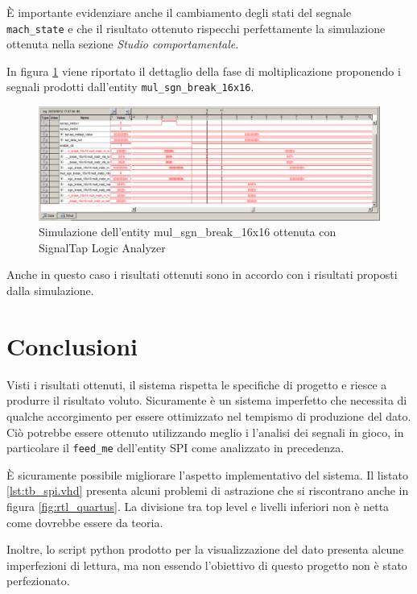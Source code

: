 \documentclass[titlepage]{report}
\begin{document}
		È importante evidenziare anche il cambiamento degli stati del segnale \texttt{mach\_state} e che il risultato ottenuto rispecchi perfettamente la simulazione ottenuta nella sezione \textit{Studio comportamentale}.

		In figura \ref*{fig:quartus_sim_signaltap2} viene riportato il dettaglio della fase di moltiplicazione proponendo i segnali prodotti dall'entity \texttt{mul\_sgn\_break\_16x16}.

		\begin{figure}[H]
			\centering
			\includegraphics[scale=0.4]{./img/signaltap_multiply_step_by_step.png}
			\caption{Simulazione dell'entity mul\_sgn\_break\_16x16 ottenuta con SignalTap Logic Analyzer}
			\label{fig:quartus_sim_signaltap2}
		\end{figure}

		Anche in questo caso i risultati ottenuti sono in accordo con i risultati proposti dalla simulazione.

\chapter*{Conclusioni}
\label{ch:conclusioni}
	
	Visti i risultati ottenuti, il sistema rispetta le specifiche di progetto e riesce a produrre il risultato voluto. Sicuramente è un sistema imperfetto che necessita di qualche accorgimento per essere ottimizzato nel tempismo di produzione del dato. Ciò potrebbe essere ottenuto utilizzando meglio i l'analisi dei segnali in gioco, in particolare il \texttt{feed\_me} dell'entity SPI come analizzato in precedenza. 

	È sicuramente possibile migliorare l'aspetto implementativo del sistema. Il listato \ref{lst:tb_spi.vhd} presenta alcuni problemi di astrazione che si riscontrano anche in figura \ref{fig:rtl_quartus}. La divisione tra top level e livelli inferiori non è netta come dovrebbe essere da teoria.

	Inoltre, lo script python prodotto per la visualizzazione del dato presenta alcune imperfezioni di lettura, ma non essendo l'obiettivo di questo progetto non è stato perfezionato.


\listoffigures
\listoftables
\lstlistoflistings
\end{document}

